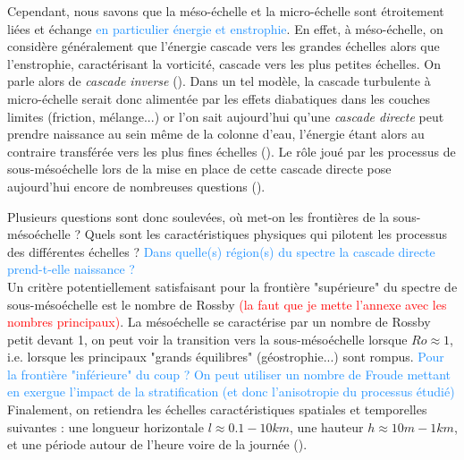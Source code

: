 \documentclass{rapportECC}
\newcommand{\FAadd}[1]{\textcolor{DodgerBlue}{{#1}}}                     %
\begin{document}
Cependant, nous savons que la méso-échelle et la micro-échelle sont étroitement liées et échange \FAadd{en particulier énergie et enstrophie}. En effet, à méso-échelle, on considère généralement que l'énergie cascade vers les grandes échelles alors que l'enstrophie, caractérisant la vorticité, cascade vers les plus petites échelles. On parle alors de \textit{cascade inverse} (\cite{vallis_atmospheric_2006}). Dans un tel modèle, la cascade turbulente à micro-échelle serait donc alimentée par les effets diabatiques dans les couches limites (friction, mélange...) or l'on sait aujourd'hui qu'une \textit{cascade directe} peut prendre naissance au sein même de la colonne d'eau, l'énergie étant alors au contraire transférée vers les plus fines échelles (\cite{taylor_submesoscale_2023}). Le rôle joué par les processus de sous-mésoéchelle lors de la mise en place de cette cascade directe pose aujourd'hui encore de nombreuses questions (\cite{McWilliams_2016}).

Plusieurs questions sont donc soulevées, où met-on les frontières de la sous-mésoéchelle ? Quels sont les caractéristiques physiques qui pilotent les processus des différentes échelles ? \FAadd{Dans quelle(s) région(s) du spectre la cascade directe prend-t-elle naissance ?}
\\
Un critère potentiellement satisfaisant pour la frontière "supérieure" du spectre de sous-mésoéchelle est le nombre de Rossby \textcolor{red}{(la faut que je mette l'annexe avec les nombres principaux)}. La mésoéchelle se caractérise par un nombre de Rossby  petit devant 1, on peut voir la transition vers la sous-mésoéchelle lorsque $Ro \approx 1$, i.e. lorsque les principaux "grands équilibres" (géostrophie...) sont rompus. \FAadd{Pour la frontière "inférieure" du coup ? On peut utiliser un nombre de Froude mettant en exergue l'impact de la stratification (et donc l'anisotropie du processus étudié) } Finalement, on retiendra les échelles caractéristiques spatiales et temporelles suivantes : une longueur horizontale $l \approx 0.1 - 10 km$, une hauteur $h \approx 10 m - 1 km$, et une période autour de l'heure voire de la journée (\cite{McWilliams_2016}).
\end{document}
